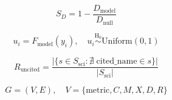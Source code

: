 \begin{equation}
\label{eq:devskill}
S_D = 1 - \frac{D_{\text{model}}}{D_{\text{null}}}
\end{equation}

\begin{equation}
\label{eq:pit}
u_i = F_{\text{model}}(y_i), \quad u_i \overset{\text{H}_0}{\sim} \mathrm{Uniform}(0,1)
\end{equation}

\begin{equation}
\label{eq:uncited}
R_{\mathrm{uncited}} = \frac{\bigl|\{ s \in S_{\mathrm{sci}} : \nexists\; \text{cited\_name} \in s \}\bigr|}{|S_{\mathrm{sci}}|}
\end{equation}

\begin{equation}
\label{eq:cmxgraph}
G = (V, E), \quad V = \{\text{metric}, C, M, X, D, R\}
\end{equation}
